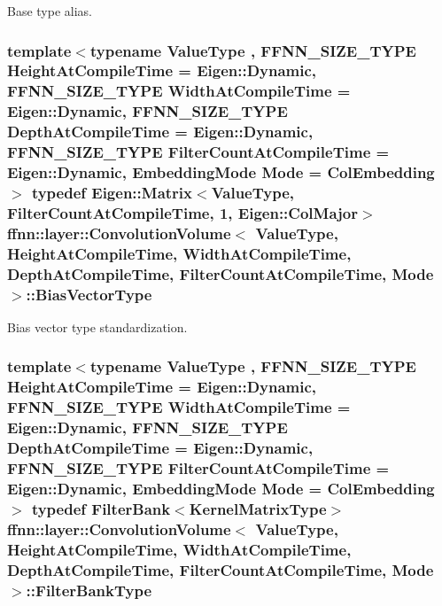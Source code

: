 Base type alias. 

\hypertarget{classffnn_1_1layer_1_1_convolution_volume_ac2655aee05415e5ffc76cf7b0ba64e61}{
\subsubsection[{Bias\-Vector\-Type}]{\setlength{\rightskip}{0pt plus 5cm}template$<$typename Value\-Type , F\-F\-N\-N\-\_\-\-S\-I\-Z\-E\-\_\-\-T\-Y\-P\-E Height\-At\-Compile\-Time = Eigen\-::\-Dynamic, F\-F\-N\-N\-\_\-\-S\-I\-Z\-E\-\_\-\-T\-Y\-P\-E Width\-At\-Compile\-Time = Eigen\-::\-Dynamic, F\-F\-N\-N\-\_\-\-S\-I\-Z\-E\-\_\-\-T\-Y\-P\-E Depth\-At\-Compile\-Time = Eigen\-::\-Dynamic, F\-F\-N\-N\-\_\-\-S\-I\-Z\-E\-\_\-\-T\-Y\-P\-E Filter\-Count\-At\-Compile\-Time = Eigen\-::\-Dynamic, Embedding\-Mode Mode = Col\-Embedding$>$ typedef Eigen\-::\-Matrix$<$Value\-Type, Filter\-Count\-At\-Compile\-Time, 1, Eigen\-::\-Col\-Major$>$ {\bf ffnn\-::layer\-::\-Convolution\-Volume}$<$ Value\-Type, Height\-At\-Compile\-Time, Width\-At\-Compile\-Time, Depth\-At\-Compile\-Time, Filter\-Count\-At\-Compile\-Time, Mode $>$\-::{\bf Bias\-Vector\-Type}}}\label{classffnn_1_1layer_1_1_convolution_volume_ac2655aee05415e5ffc76cf7b0ba64e61}


Bias vector type standardization. 

\hypertarget{classffnn_1_1layer_1_1_convolution_volume_a73cb805b7ffa2bc96461412e1cf958f9}{
\subsubsection[{Filter\-Bank\-Type}]{\setlength{\rightskip}{0pt plus 5cm}template$<$typename Value\-Type , F\-F\-N\-N\-\_\-\-S\-I\-Z\-E\-\_\-\-T\-Y\-P\-E Height\-At\-Compile\-Time = Eigen\-::\-Dynamic, F\-F\-N\-N\-\_\-\-S\-I\-Z\-E\-\_\-\-T\-Y\-P\-E Width\-At\-Compile\-Time = Eigen\-::\-Dynamic, F\-F\-N\-N\-\_\-\-S\-I\-Z\-E\-\_\-\-T\-Y\-P\-E Depth\-At\-Compile\-Time = Eigen\-::\-Dynamic, F\-F\-N\-N\-\_\-\-S\-I\-Z\-E\-\_\-\-T\-Y\-P\-E Filter\-Count\-At\-Compile\-Time = Eigen\-::\-Dynamic, Embedding\-Mode Mode = Col\-Embedding$>$ typedef {\bf Filter\-Bank}$<${\bf Kernel\-Matrix\-Type}$>$ {\bf ffnn\-::layer\-::\-Convolution\-Volume}$<$ Value\-Type, Height\-At\-Compile\-Time, Width\-At\-Compile\-Time, Depth\-At\-Compile\-Time, Filter\-Count\-At\-Compile\-Time, Mode $>$\-::{\bf Filter\-Bank\-Type}}}\label{classffnn_1_1layer_1_1_convolution_volume_a73cb805b7ffa2bc96461412e1cf958f9}


